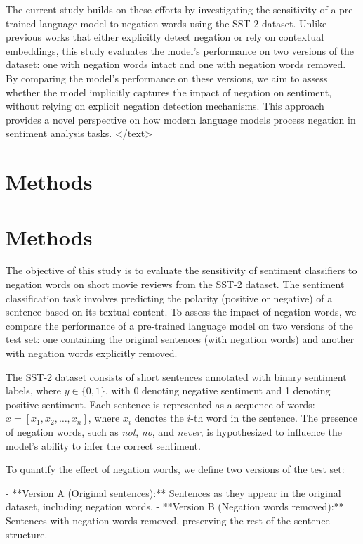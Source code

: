 \documentclass{article}
\begin{document}
The current study builds on these efforts by investigating the sensitivity of a pre-trained language model to negation words using the SST-2 dataset. Unlike previous works that either explicitly detect negation or rely on contextual embeddings, this study evaluates the model's performance on two versions of the dataset: one with negation words intact and one with negation words removed. By comparing the model's performance on these versions, we aim to assess whether the model implicitly captures the impact of negation on sentiment, without relying on explicit negation detection mechanisms. This approach provides a novel perspective on how modern language models process negation in sentiment analysis tasks.
</text>
\section{Methods}
\section*{Methods}

The objective of this study is to evaluate the sensitivity of sentiment classifiers to negation words on short movie reviews from the SST-2 dataset. The sentiment classification task involves predicting the polarity (positive or negative) of a sentence based on its textual content. To assess the impact of negation words, we compare the performance of a pre-trained language model on two versions of the test set: one containing the original sentences (with negation words) and another with negation words explicitly removed. 

The SST-2 dataset consists of short sentences annotated with binary sentiment labels, where $ y \in \{0, 1\} $, with 0 denoting negative sentiment and 1 denoting positive sentiment. Each sentence is represented as a sequence of words: $ x = [x_1, x_2, \dots, x_n] $, where $ x_i $ denotes the $ i $-th word in the sentence. The presence of negation words, such as \textit{not}, \textit{no}, and \textit{never}, is hypothesized to influence the model's ability to infer the correct sentiment. 

To quantify the effect of negation words, we define two versions of the test set:

- **Version A (Original sentences):** Sentences as they appear in the original dataset, including negation words.
- **Version B (Negation words removed):** Sentences with negation words removed, preserving the rest of the sentence structure.
\end{document}
